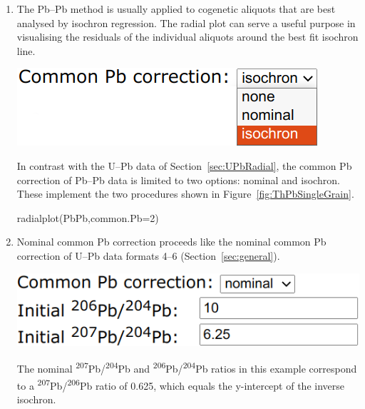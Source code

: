 \begin{refsection}
\begin{enumerate}

\item The Pb--Pb method is usually applied to cogenetic aliquots that are
best analysed by isochron regression. The radial plot can serve a
useful purpose in visualising the residuals of the individual aliquots
around the best fit isochron line.\\

\noindent\begin{minipage}[t]{.35\linewidth}
\strut\vspace*{-\baselineskip}\newline
\includegraphics[width=\linewidth]{../figures/PbPbRadialPb0.png}
\end{minipage}
\begin{minipage}[t]{.65\linewidth}
  In contrast with the U--Pb data of Section~\ref{sec:UPbRadial}, the
  common Pb correction of Pb--Pb data is limited to two options:
  nominal and isochron. These implement the two procedures shown in
  Figure~\ref{fig:ThPbSingleGrain}.
\end{minipage}

\begin{console}
radialplot(PbPb,common.Pb=2)
\end{console}

\item Nominal common Pb correction proceeds like the nominal common Pb
  correction of U--Pb data formats 4--6 (Section~\ref{sec:general}).

\noindent\begin{minipage}[t]{.4\linewidth}
\strut\vspace*{-\baselineskip}\newline
\includegraphics[width=\linewidth]{../figures/PbPbnominalPb0.png}
\end{minipage}
\begin{minipage}[t]{.6\linewidth}
  The nominal \textsuperscript{207}Pb/\textsuperscript{204}Pb and
  \textsuperscript{206}Pb/\textsuperscript{204}Pb ratios in this
  example correspond to a
  \textsuperscript{207}Pb/\textsuperscript{206}Pb ratio of 0.625,
  which equals the y-intercept of the inverse isochron.
\end{minipage}


\end{enumerate}
\end{refsection}
